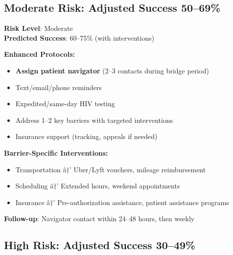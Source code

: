 \documentclass[11pt]{article}
\begin{document}
\subsection{Moderate Risk: Adjusted Success 50--69\%}

\begin{tcolorbox}[colback=yellow!15!white,colframe=yellow!75!black,breakable]
\textbf{Risk Level}: Moderate \\
\textbf{Predicted Success}: 60--75\% (with interventions)

\textbf{Enhanced Protocols:}
\begin{itemize}[leftmargin=*]
\item \textbf{Assign patient navigator} (2--3 contacts during bridge period)
\item Text/email/phone reminders
\item Expedited/same-day HIV testing
\item Address 1--2 key barriers with targeted interventions
\item Insurance support (tracking, appeals if needed)
\end{itemize}

\textbf{Barrier-Specific Interventions:}
\begin{itemize}[leftmargin=*]
\item Transportation â†’ Uber/Lyft vouchers, mileage reimbursement
\item Scheduling â†’ Extended hours, weekend appointments
\item Insurance â†’ Pre-authorization assistance, patient assistance programs
\end{itemize}

\textbf{Follow-up}: Navigator contact within 24--48 hours, then weekly
\end{tcolorbox}

\subsection{High Risk: Adjusted Success 30--49\%}
\end{document}
